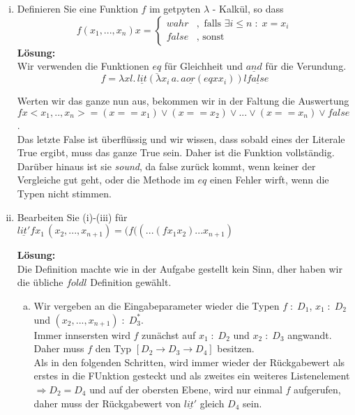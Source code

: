\documentclass[11pt,a4paper,ngerman]{article}
\begin{document}
\begin{enumerate}[(i)]
   \item Definieren Sie eine Funktion $f$ im getpyten $\lambda$ - Kalkül, so
      dass 
      $$
         f(x_1, ... , x_n) x = \left\{\begin{array}{lr}
            wahr &, \text{ falls }\exists i \leq n \; : \; x=x_i\\
            false &, \text{ sonst}
         \end{array}\right.
      $$
   \textbf{Lösung:}\\
     Wir verwenden die Funktionen $\underline{eq}$ für Gleichheit und $\underline{and}$
      für die Verundung.\\
      $$
         f = \lambda x l. \, \underline{lit} (\lambda x_i \, a . \, a \underline{or} (eq x x_i)) l \underline{false}
      $$

      Werten wir das ganze nun aus, bekommen wir in der Faltung die Auswertung\\
      $f x <x_1,..,x_n> = (x == x_1) \lor (x==x_2) \lor ... \lor (x==x_n) \lor false$.\\

      Das letzte False ist überflüssig und wir wissen, dass sobald eines der Literale True ergibt,
      muss das ganze True sein. Daher ist die Funktion vollständig.\\

      Darüber hinaus ist sie \emph{sound}, da false zurück kommt, wenn keiner der Vergleiche gut geht,
      oder die Methode im $eq$ einen Fehler wirft, wenn die Typen nicht stimmen.

   \item Bearbeiten Sie (i)-(iii) für \\
      $\underline{lit'} f x_1\, (x_2,...,x_{n+1}) = (f ((...(f x_1 x_2) ... x_{n+1})$
      
   \textbf{Lösung:}\\
      Die Definition machte wie in der Aufgabe gestellt kein Sinn, dher haben wir
      die übliche $foldl$ Definition gewählt.

      \begin{enumerate}[a.]
         \item Wir vergeben an die Eingabeparameter wieder die Typen $f \; : \; D_1$,
            $x_1 \; : \; D_2$ und $(x_2,...,x_{n+1}) \; : \; D_3^*$.\\

            Immer innsersten wird $f$ zunächst auf $x_1 \; : \; D_2$ und $x_2 \; : \; D_3$ angwandt.
            Daher muss $f$ den Typ $[D_2 \rightarrow D_3 \rightarrow D_4]$ besitzen.\\
            Als in den folgenden Schritten, wird immer wieder der Rückgabewert als erstes in die FUnktion
            gesteckt und als zweites ein weiteres Listenelement\\
            $\Rightarrow D_2 = D_4$ und auf der obersten Ebene, wird nur einmal $f$ aufgerufen,
            daher muss der Rückgabewert von $\underline{lit'}$ gleich $D_4$ sein.\\


\end{enumerate}
\end{enumerate}
\end{document}
